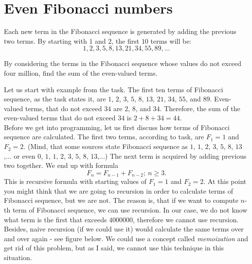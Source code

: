 \documentclass{book}
\newenvironment{task}
  {\begin{mdframed}[backgroundcolor=lightgray]}
  {\end{mdframed}}
\begin{document}
\pagebreak


\section{Even Fibonacci numbers}

\begin{task}
Each new term in the Fibonacci sequence is generated by adding the previous two terms. By starting with $1$ and $2$, the first $10$ terms will be: \[1,2,3,5,8,13,21,34,55,89,\dotsc\]

By considering the terms in the Fibonacci sequence whose values do not exceed four million, find the sum of the even-valued terms.
\end{task}

Let us start with example from the task. The first ten terms of Fibonacci sequence, as the task states it, are $1$, $2$, $3$, $5$, $8$, $13$, $21$, $34$, $55$, and $89$. Even-valued terms, that do not exceed $34$ are $2$, $8$, and $34$. Therefore, the sum of the even-valued terms that do not exceed $34$ is $2+8+34 = 44$.\\

Before we get into programming, let us first discuss how terms of Fibonacci sequence are calculated. The first two terms, according to task, are $F_1 = 1$ and $F_2 = 2$. (Mind, that some sources state Fibonacci sequence as $1$, $1$, $2$, $3$, $5$, $8$, $13$,... or even $0$, $1$, $1$, $2$, $3$, $5$, $8$, $13$,...) The next term is acquired by adding previous two together. We end up with formula \[F_n = F_{n-1} + F_{n-2};~n \geq 3.\] This is recursive formula with starting values of $F_1 = 1$ and $F_2 = 2$. At this point you might think that we are going to recursion in order to calculate terms of Fibonacci sequence, but we are not. The reason is, that if we want to compute $n$-th term of Fibonacci sequence, we can use recursion. In our case, we do not know what term is the first that exceeds $4000000$, therefore we cannot use recursion. Besides, naive recursion (if we could use it) would calculate the same terms over and over again - see figure below. We could use a concept called \textit{memoization} and get rid of this problem, but as I said, we cannot use this technique in this situation.
\end{document}
